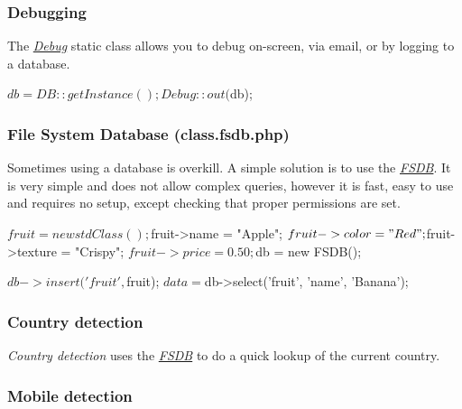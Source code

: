 \subsubsection*{Debugging}

The {\itshape \hyperlink{class_debug}{Debug}} static class allows you to debug on-\/screen, via email, or by logging to a database. \begin{DoxyVerb}$db = DB::getInstance();
Debug::out($db);
\end{DoxyVerb}


\subsubsection*{File System Database (class.\-fsdb.\-php)}

Sometimes using a database is overkill. A simple solution is to use the {\itshape \hyperlink{class_f_s_d_b}{F\-S\-D\-B}}. It is very simple and does not allow complex queries, however it is fast, easy to use and requires no setup, except checking that proper permissions are set. \begin{DoxyVerb}$fruit = new stdClass();

$fruit->name = "Apple";
$fruit->color = "Red";
$fruit->texture = "Crispy";
$fruit->price = 0.50;

$db = new FSDB();

$db->insert('fruit', $fruit);
$data = $db->select('fruit', 'name', 'Banana');
\end{DoxyVerb}


\subsubsection*{Country detection}

{\itshape Country detection} uses the {\itshape \hyperlink{class_f_s_d_b}{F\-S\-D\-B}} to do a quick lookup of the current country. 


\subsubsection*{Mobile detection}

